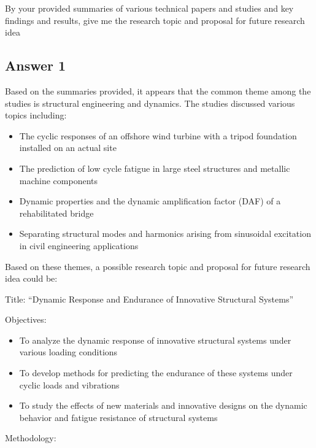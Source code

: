 \documentclass[
  letterpaper,
  DIV=11,
  numbers=noendperiod]{scrreprt}
\providecommand{\tightlist}{%
  \setlength{\itemsep}{0pt}\setlength{\parskip}{0pt}}\usepackage{longtable,booktabs,array}
\begin{document}
By your provided summaries of various technical papers and studies and
key findings and results, give me the research topic and proposal for
future research idea

\hypertarget{answer-1}{%
\subsection{Answer 1}\label{answer-1}}

Based on the summaries provided, it appears that the common theme among
the studies is structural engineering and dynamics. The studies
discussed various topics including:

\begin{itemize}
\tightlist
\item
  The cyclic responses of an offshore wind turbine with a tripod
  foundation installed on an actual site
\item
  The prediction of low cycle fatigue in large steel structures and
  metallic machine components
\item
  Dynamic properties and the dynamic amplification factor (DAF) of a
  rehabilitated bridge
\item
  Separating structural modes and harmonics arising from sinusoidal
  excitation in civil engineering applications
\end{itemize}

Based on these themes, a possible research topic and proposal for future
research idea could be:

Title: ``Dynamic Response and Endurance of Innovative Structural
Systems''

Objectives:

\begin{itemize}
\tightlist
\item
  To analyze the dynamic response of innovative structural systems under
  various loading conditions
\item
  To develop methods for predicting the endurance of these systems under
  cyclic loads and vibrations
\item
  To study the effects of new materials and innovative designs on the
  dynamic behavior and fatigue resistance of structural systems
\end{itemize}

Methodology:
\end{document}
